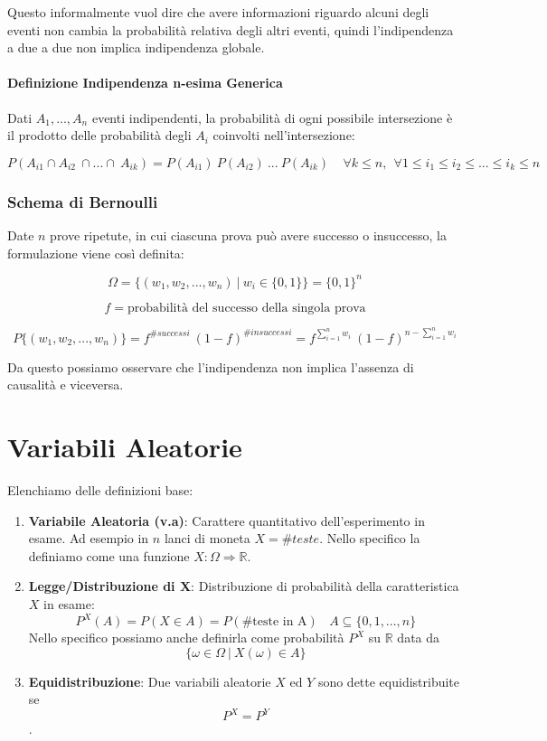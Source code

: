 \documentclass{article}
\begin{document}
Questo informalmente vuol dire che avere informazioni riguardo alcuni degli eventi non cambia la probabilità relativa degli altri eventi, quindi l'indipendenza a due a due non implica indipendenza globale.

\paragraph{Definizione Indipendenza n-esima Generica} Dati $A_{1}, ..., A_{n}$ eventi indipendenti, la probabilità di ogni possibile intersezione è
il prodotto delle probabilità degli $A_{i}$ coinvolti nell'intersezione:

\vspace{-15px}

\[ P(A_{i1} \cap A_{i2} \: \cap ... \cap \: A_{ik}) = P(A_{i1}) \: P(A_{i2}) \: ... \: P(A_{ik}) \:\:\:\:\: \forall k \leq n, \:\: \forall 1 \leq i_{1} \leq i_{2} \leq ... \leq i_{k} \leq n  \]

\newpage

\subsubsection{Schema di Bernoulli}

Date $n$ prove ripetute, in cui ciascuna prova può avere successo o insuccesso, la formulazione viene così definita:

\[ \Omega = \{ (w_{1}, w_{2}, ..., w_{n}) \: | \: w_{i} \in \{0,1\} \} = \{0,1\}^{n} \]

\[ f = \text{probabilità del successo della singola prova} \]

\vspace{-15px}

\[ P\{ (w_{1}, w_{2}, ..., w_{n}) \} = f^{\#successi} \: (1-f)^{\#insuccessi} = f^{\sum_{i=1}^{n}w_{i}} \: (1-f)^{n - \sum_{i=1}^{n}w_{i}} \]

Da questo possiamo osservare che l'indipendenza non implica l'assenza di causalità e viceversa.

\section{Variabili Aleatorie}

Elenchiamo delle definizioni base:

\begin{enumerate}
    \item \textbf{Variabile Aleatoria (v.a)}: Carattere quantitativo dell'esperimento in esame. Ad esempio in $n$ lanci di moneta $X=\#teste$.
    Nello specifico la definiamo come una funzione $X:\Omega \Rightarrow \mathbb{R}$.
    \item \textbf{Legge/Distribuzione di X}: Distribuzione di probabilità della caratteristica $X$ in esame:
    \[ P^{X}(A) = P(X \in A) = P(\#\text{teste in A}) \:\:\:\: A \subseteq \{0,1, ...,n\} \]
    Nello specifico possiamo anche definirla come probabilità $P^{X}$ su $\mathbb{R}$ data da 
    \[ \{\omega \in \Omega \:|\: X(\omega) \in A\} \]
    \item \textbf{Equidistribuzione}: Due variabili aleatorie $X$ ed $Y$ sono dette equidistribuite se \[P^{X} = P^{Y}\].
\end{enumerate}
\end{document}

